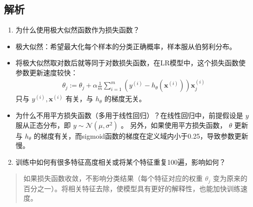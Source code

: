\documentclass[letterpaper,10pt,english]{sphinxmanual}
\begin{document}
\subsection{解析}
\label{\detokenize{machineLearning/01_lr:id4}}\begin{enumerate}
\item {} 
为什么使用极大似然函数作为损失函数？

\end{enumerate}
\begin{itemize}
\item {} 
极大似然：希望最大化每个样本的分类正确概率，样本服从伯努利分布。

\item {} 
将极大似然取对数后就等同于对数损失函数，在LR模型中，这个损失函数使参数更新速度较快：
\begin{equation*}
\begin{split}\theta_j := \theta_j + \alpha \frac{1}{m} \sum_{i=1}^m (y^{(i)} - h_\theta(\mathbf{x}^{(i)}))\mathbf{x}_j^{(i)}\end{split}
\end{equation*}
只与 \(y^{(i)},\mathbf{x}^{(i)}\) 有关，与 \(h_\theta\) 的梯度无关。

\item {} 
为什么不用平方损失函数（多用于线性回归）？在线性回归中，前提假设是 \(y\) 服从正态分布，即 \(y \sim \mathcal{N}(\mu, \sigma^2)\) 。
另外，如果使用平方损失函数， \(\theta\) 更新与 \(h_\theta\) 的梯度有关，而sigmoid函数的梯度在定义域内小于0.25，导致参数更新慢。

\end{itemize}
\begin{enumerate}
\setcounter{enumi}{1}
\item {} 
训练中如何有很多特征高度相关或将某个特征重复100遍，影响如何？

\end{enumerate}
\begin{quote}

如果损失函数收敛，不影响分类结果（每个特征对应的权重 \(\theta_j\) 变为原来的百分之一）。将相关特征去除，使模型具有更好的解释性，也能加快训练速度。
\end{quote}
\end{document}
